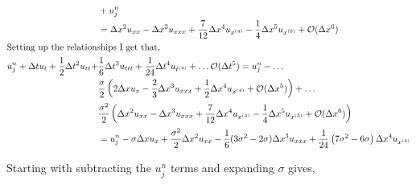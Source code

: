 \begin{enumerate}[label=\alph*., start = 1]
\begin{align*}
        & + u_j^n\\
        & = \Delta x^2 u_{xx} - \Delta x^3 u_{xxx} + \frac{7}{12}\Delta x^4 u_{x^{(4)}} - \frac{1}{4}\Delta x^5u_{x^{(5)}} + \mathcal{O}(\Delta x^6)\\
        \shortintertext{Setting up the relationships I get that,}
        u_j^n + \Delta tu_t + \frac{1}{2}\Delta t^2u_{tt} + & \frac{1}{6}\Delta t^3 u_{ttt} + \frac{1}{24}\Delta t^4u_{t^{(4)}} + \ldots \mathcal{O}(\Delta t^5)  = u_j^n - \ldots \\
        & \frac{\sigma}{2}\left( 2\Delta xu_x - \frac{2}{3}\Delta x^3 u_{xxx} + \frac{1}{2}\Delta x^4u_{x^{(4)}} + \mathcal{O}(\Delta x^5) \right) + \ldots \\
        & \frac{\sigma^2}{2}\left( \Delta x^2 u_{xx} - \Delta x^3 u_{xxx} + \frac{7}{12}\Delta x^4 u_{x^{(4)}} - \frac{1}{4}\Delta x^5u_{x^{(5)}} + \mathcal{O}(\Delta x^6) \right)\\
        & = u_j^n - \sigma\Delta xu_x + \frac{\sigma^2}{2}\Delta x^2u_{xx} - \frac{1}{6}(3\sigma^2 - 2\sigma)\Delta x^3u_{xxx} + \frac{1}{24}\left(7\sigma^2 - 6\sigma\right)\Delta x^4u_{x^{(4)}}
    \end{align*}

    \pagebreak

    Starting with subtracting the $u_j^n$ terms and expanding $\sigma$ gives,


\end{enumerate}
